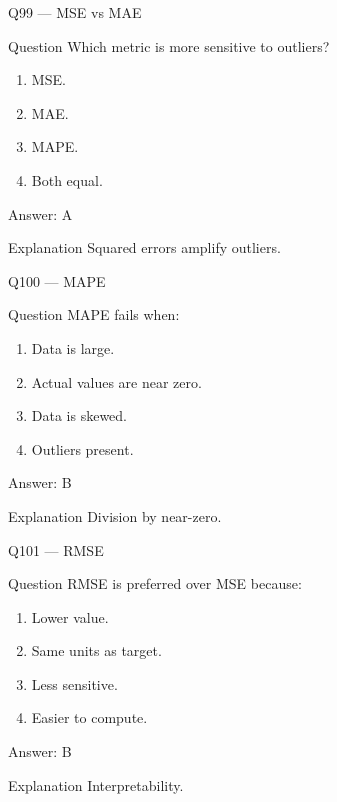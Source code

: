 \documentclass[aspectratio=169,8pt]{beamer}
\begin{document}
	\begin{frame}{Q99 --- MSE vs MAE}
		\begin{block}{Question}
			Which metric is more sensitive to outliers?
		\end{block}
		\begin{enumerate}
			\item MSE.
			\item MAE.
			\item MAPE.
			\item Both equal.
		\end{enumerate}
		\begin{exampleblock}{Answer: A}\end{exampleblock}
		\begin{block}{Explanation}
			Squared errors amplify outliers.
		\end{block}
	\end{frame}
	
	\begin{frame}{Q100 --- MAPE}
		\begin{block}{Question}
			MAPE fails when:
		\end{block}
		\begin{enumerate}
			\item Data is large.
			\item Actual values are near zero.
			\item Data is skewed.
			\item Outliers present.
		\end{enumerate}
		\begin{exampleblock}{Answer: B}\end{exampleblock}
		\begin{block}{Explanation}
			Division by near-zero.
		\end{block}
	\end{frame}
	
	\begin{frame}{Q101 --- RMSE}
		\begin{block}{Question}
			RMSE is preferred over MSE because:
		\end{block}
		\begin{enumerate}
			\item Lower value.
			\item Same units as target.
			\item Less sensitive.
			\item Easier to compute.
		\end{enumerate}
		\begin{exampleblock}{Answer: B}\end{exampleblock}
		\begin{block}{Explanation}
			Interpretability.
		\end{block}
	\end{frame}
	
\end{document}
